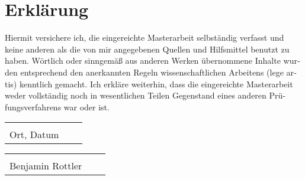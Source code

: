 \chapter*{Erklärung}
\vspace{2.5cm}
\begin{otherlanguage}{ngerman}
    Hiermit versichere ich, die eingereichte Masterarbeit selbständig verfasst und
    keine anderen als die von mir angegebenen Quellen und Hilfsmittel benutzt zu haben.
    Wörtlich oder sinngemäß aus anderen Werken übernommene Inhalte wurden entsprechend den anerkannten Regeln
    wissenschaftlichen Arbeitens (lege artis) kenntlich gemacht. Ich erkläre weiterhin, dass die eingereichte
    Masterarbeit weder vollständig noch in wesentlichen Teilen Gegenstand eines
    anderen Prüfungsverfahrens war oder ist.
    \\[3.5cm]
    \begin{tabular}{p{7cm}p{0.5cm}l}
        \dotfill \\ 
        Ort, Datum
    \end{tabular}

    \vspace{1.5 cm}
    \begin{tabular}{p{7cm}p{0.5cm}l}
        \dotfill \\ 
        Benjamin Rottler
    \end{tabular}
\end{otherlanguage}
